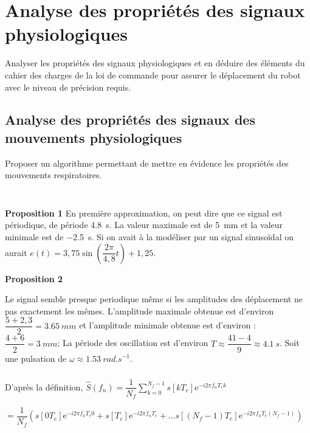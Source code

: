 \documentclass[10pt,fleqn]{article} %
\begin{document}

\vspace{4.5cm}
\pagestyle{fancy}
\thispagestyle{plain}


\def\columnseprulecolor{\color{ocre}}
\setlength{\columnseprule}{0.4pt} 

\section{Analyse des propriétés des signaux physiologiques}

\begin{obj}
Analyser les propriétés des signaux physiologiques et en déduire des éléments du cahier des charges
de la loi de commande pour assurer le déplacement du robot avec le niveau de précision requis.
\end{obj}

\subsection{Analyse des propriétés des signaux des mouvements physiologiques}

\begin{obj}
Proposer un algorithme permettant de mettre en évidence les propriétés des mouvements respiratoires.
\end{obj}
\subparagraph{} ~\\ %
\textbf{Proposition 1}
En première approximation, on peut dire que ce signal est périodique, de période \SI{4,8}{s}. La valeur maximale est de \SI{5}{mm} et la valeur minimale est de \SI{-2,5}{s}.
Si on avait à la modéliser par un signal sinusoïdal on aurait $e(t)=3,75 \sin\left(\dfrac{2\pi}{4,8} t\right) + 1,25$.

\textbf{Proposition 2}

Le signal semble presque periodique même si les amplitudes des déplacement ne pas exactement les mêmes.
L'amplitude maximale obtenue est d'environ $\dfrac{5+2,3}{2}=\SI{3,65}{mm}$ et l'amplitude minimale obtenue est d'environ : $\dfrac{4+6}{2}=\SI{3}{mm}$;
La période des oscillation est d'environ $
T\approx\dfrac{41-4}{9}\approx \SI{4,1}{s}$. 
Soit une pulsation de $\omega\approx \SI{1,53}{rad.s^{-1}}$.


\subparagraph{} %
D'après la définition, 
$\hat{S}\left( f_n\right)= \dfrac{1}{N_f} \sum \limits_{k=0}^{N_f-1} s\left[kT_e\right] \text{e}^{-i 2 \pi f_nT_e k}$

$= \dfrac{1}{N_f} \left(
 s\left[0 T_e\right] \text{e}^{-i 2 \pi f_nT_e 0} + 
 s\left[T_e\right] \text{e}^{-i 2 \pi f_nT_e } + ... 
 s\left[\left( N_f-1\right)T_e\right] \text{e}^{-i 2 \pi f_nT_e \left( N_f-1\right)}\right)$
\end{document}
